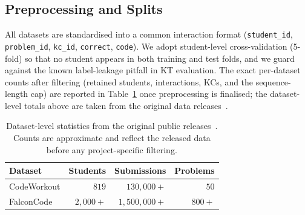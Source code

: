 \subsection{Preprocessing and Splits}
All datasets are standardised into a common interaction format
(\texttt{student\_id}, \texttt{problem\_id}, \texttt{kc\_id},
\texttt{correct}, \texttt{code}). We adopt student-level
cross-validation (5-fold) so that no student appears in both training and
test folds, and we guard against the known label-leakage pitfall in KT
evaluation. The exact per-dataset counts after filtering (retained
students, interactions, KCs, and the sequence-length cap) are reported in
Table~\ref{tab:datastats} once preprocessing is finalised; the
dataset-level totals above are taken from the original data
releases~\cite{csedm2021,falconcode2023}.

\begin{table}[t]
\caption{Dataset-level statistics from the original public
releases~\cite{csedm2021,falconcode2023}. Counts are approximate and
reflect the released data before any project-specific filtering.}
\label{tab:datastats}
\centering
\small
\begin{tabular}{@{}lrrr@{}}
\toprule
\textbf{Dataset} & \textbf{Students} & \textbf{Submissions}
                 & \textbf{Problems} \\
\midrule
CodeWorkout & $819$      & $130{,}000+$ & $50$ \\
FalconCode  & $2{,}000+$ & $1{,}500{,}000+$ & $800+$ \\
\bottomrule
\end{tabular}
\end{table}
